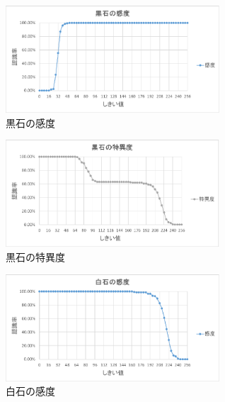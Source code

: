 \documentclass[openright]{nitocs}
\numberwithin{equation}{section}
\begin{document}
            \begin{figure} %
                \begin{center}
                \includegraphics[width=80mm,height=40mm]{Black_TPF.eps} 
                \caption{黒石の感度}
                \label{Black_TPF}
                \end{center}
            \end{figure}

            \begin{figure} %
                \begin{center}
                \includegraphics[width=80mm,height=40mm]{Black_TNF.eps} 
                \caption{黒石の特異度}
                \label{Black_TNF}
                \end{center}
            \end{figure}

            \begin{figure} %
                \begin{center}
                \includegraphics[width=80mm,height=40mm]{White_TPF.eps} 
                \caption{白石の感度}
                \label{White_TPF}
                \end{center}
            \end{figure}
            
\end{document}
